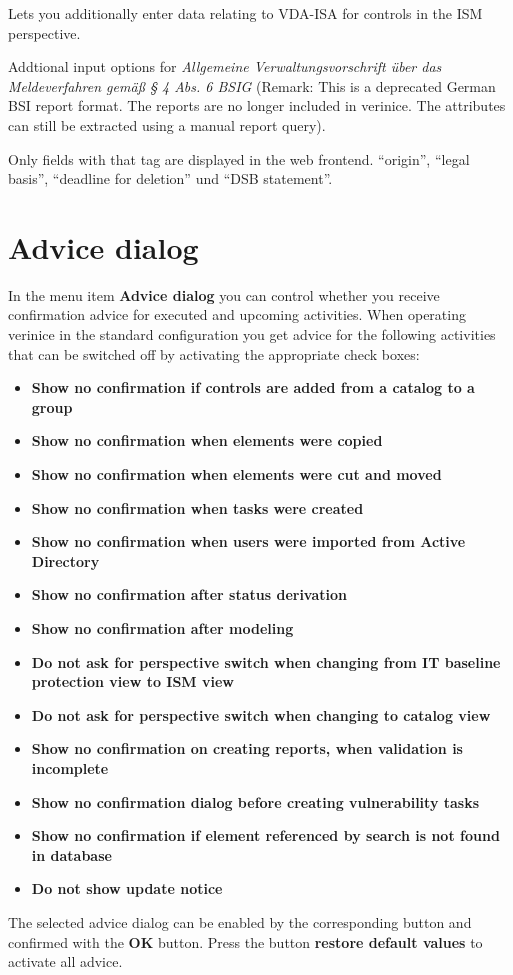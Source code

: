 \documentclass[a4paper,10pt]{book}
\newcommand*{\descrfont}[1]{\textit{#1 -}}
\begin{document}
\begin{description}[font=\normalfont\descrfont]
	\item[VDA\_ISA\_Audit] Lets you additionally enter data relating to VDA-ISA for controls in the ISM perspective.
	\item[VV-BSIG] Addtional input options for \emph{Allgemeine Verwaltungsvorschrift über das Meldeverfahren gemäß § 4 Abs. 6 BSIG} (Remark: This is a deprecated German BSI report format. The reports are no longer included in verinice. The attributes can still be extracted using a manual report query).
	\item[Web] Only fields with that tag are displayed in the web frontend.  ``origin'', ``legal basis'', ``deadline for deletion'' und ``DSB statement''.
\end{description}

\section{Advice dialog}
In the menu item \textbf{Advice dialog} you can control whether you receive confirmation advice for executed and upcoming activities. When operating verinice in the standard configuration you get advice for the following activities that can be switched off by activating the appropriate check boxes:
\begin{itemize}
 \item \textbf{Show no confirmation if controls are added from a catalog to a group}
 \item \textbf{Show no confirmation when elements were copied}
 \item \textbf{Show no confirmation when elements were cut and moved}
 \item \textbf{Show no confirmation when tasks were created}
 \item \textbf{Show no confirmation when users were imported from Active Directory}
 \item \textbf{Show no confirmation after status derivation}
 \item \textbf{Show no confirmation after modeling}
 \item \textbf{Do not ask for perspective switch when changing from IT baseline protection view to ISM view}
 \item \textbf{Do not ask for perspective switch when changing to catalog view}
 \item \textbf{Show no confirmation on creating reports, when validation is incomplete}
 \item \textbf{Show no confirmation dialog before creating vulnerability tasks}
 \item \textbf{Show no confirmation if element referenced by search is not found in database}
 \item \textbf{Do not show update notice}
\end{itemize}
The selected advice dialog can be enabled by the corresponding button and confirmed with the \textbf{OK} button.
Press the button \textbf{restore default values} to activate all advice.
\end{document}
